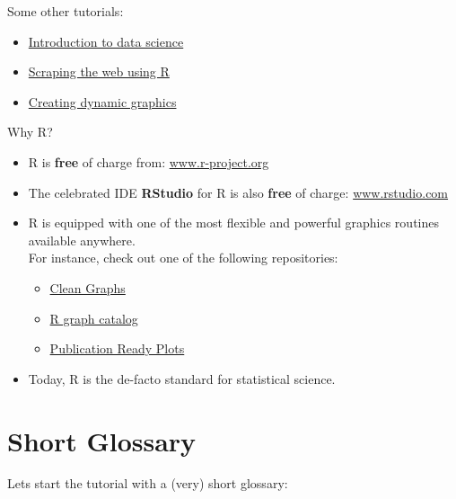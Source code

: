 \documentclass[
]{book}
\providecommand{\tightlist}{%
  \setlength{\itemsep}{0pt}\setlength{\parskip}{0pt}}
\begin{document}
Some other tutorials:

\begin{itemize}
\tightlist
\item
  \href{https://idc9.github.io/stor390/}{Introduction to data science}
\item
  \href{https://stat4701.github.io/edav/2015/04/02/rvest_tutorial/}{Scraping the web using R}
\item
  \href{https://gganimate.com/}{Creating dynamic graphics}
\end{itemize}

Why R?

\begin{itemize}
\tightlist
\item
  R is \textbf{free} of charge from: \href{https://www.r-project.org/}{www.r-project.org}
\item
  The celebrated IDE \textbf{RStudio} for R is also \textbf{free} of charge: \href{http://www.rstudio.com/}{www.rstudio.com}
\item
  R is equipped with one of the most flexible and powerful graphics routines available anywhere.\\
  For instance, check out one of the following repositories:

  \begin{itemize}
  \tightlist
  \item
    \href{http://shinyapps.org/apps/RGraphCompendium/index.php}{Clean Graphs}
  \item
    \href{http://shiny.stat.ubc.ca/r-graph-catalog/}{R graph catalog}
  \item
    \href{http://www.sthda.com/english/rpkgs/ggpubr/}{Publication Ready Plots}
  \end{itemize}
\item
  Today, R is the de-facto standard for statistical science.
\end{itemize}

\hypertarget{short-glossary}{%
\section{Short Glossary}\label{short-glossary}}

Lets start the tutorial with a (very) short glossary:
\end{document}
